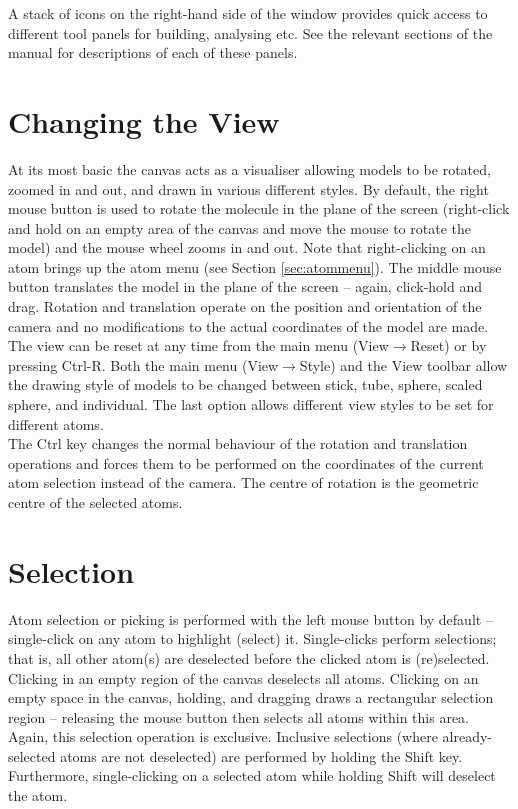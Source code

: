 A stack of icons on the right-hand side of the window provides quick access to different tool panels for building, analysing etc. See the relevant sections of the manual for descriptions of each of these panels.

\section{Changing the View}
At its most basic the canvas acts as a visualiser allowing models to be rotated, zoomed in and out, and drawn in various different styles. By default, the right mouse button is used to rotate the molecule in the plane of the screen (right-click and hold on an empty area of the canvas and move the mouse to rotate the model) and the mouse wheel zooms in and out. Note that right-clicking on an atom brings up the atom menu (see Section \ref{sec:atommenu}). The middle mouse button translates the model in the plane of the screen -- again, click-hold and drag. Rotation and translation operate on the position and orientation of the camera and no modifications to the actual coordinates of the model are made. The view can be reset at any time from the main menu (View$\rightarrow$Reset) or by pressing Ctrl-R. Both the main menu (View$\rightarrow$Style) and the View toolbar allow the drawing style of models to be changed between stick, tube, sphere, scaled sphere, and individual. The last option allows different view styles to be set for different atoms.\\

The Ctrl key changes the normal behaviour of the rotation and translation operations and forces them to be performed on the coordinates of the current atom selection instead of the camera. The centre of rotation is the geometric centre of the selected atoms.

\section{Selection}
Atom selection or picking is performed with the left mouse button by default -- single-click on any atom to highlight (select) it. Single-clicks perform  selections; that is, all other atom(s) are deselected before the clicked atom is (re)selected. Clicking in an empty region of the canvas deselects all atoms. Clicking on an empty space in the canvas, holding, and dragging draws a rectangular selection region -- releasing the mouse button then selects all atoms within this area. Again, this selection operation is exclusive. Inclusive selections (where already-selected atoms are not deselected) are performed by holding the Shift key. Furthermore, single-clicking on a selected atom while holding Shift will deselect the atom.\\


